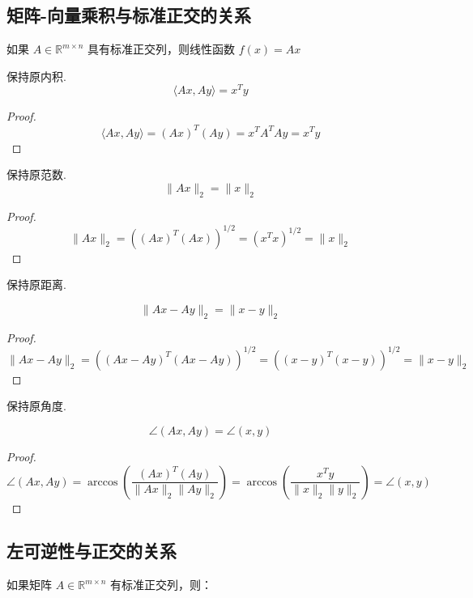 \subsection{矩阵-向量乘积与标准正交的关系}

如果 $ A \in \mathbb{R}^{m \times n} $ 具有标准正交列，则线性函数 $ f(x)=A x $

\begin{theorem}
    保持原内积.
    $$ \langle A x, A y\rangle=x^{T} y $$
\end{theorem}

\begin{proof}
    $$ \langle A x, A y\rangle=(A x)^{T}(A y)=x^{T} A^{T} A y=x^{T} y $$
\end{proof}


\begin{theorem}
    保持原范数.
    $$
    \|A x\|_{2}=\|x\|_{2}
    $$
\end{theorem}

\begin{proof}
   $$
\|A x\|_{2}=\left((A x)^{T}(A x)\right)^{1 / 2}=\left(x^{T} x\right)^{1 / 2}=\|x\|_{2}
$$
\end{proof}

\begin{theorem}
    保持原距离.

    $$
    \|A x-A y\|_{2}=\|x-y\|_{2}
    $$
\end{theorem}

\begin{proof}
   $$
\|A x-A y\|_{2}=\left((A x-A y)^{T}(A x-A y)\right)^{1 / 2}=\left((x-y)^{T}(x-y)\right)^{1 / 2}=\|x-y\|_{2}
$$
\end{proof}

\begin{theorem}
    保持原角度.

    $$ \angle(A x, A y)=\angle(x, y) $$
\end{theorem}

\begin{proof}
    $$ \angle(A x, A y)=\arccos \left(\frac{(A x)^{T}(A y)}{\|A x\|_{2}\|A y\|_{2}}\right)=\arccos \left(\frac{x^{T} y}{\|x\|_{2}\|y\|_{2}}\right)=\angle(x, y) $$
\end{proof}

\subsection{左可逆性与正交的关系}


如果矩阵 $ A \in \mathbb{R}^{m \times n} $ 有标准正交列，则：

